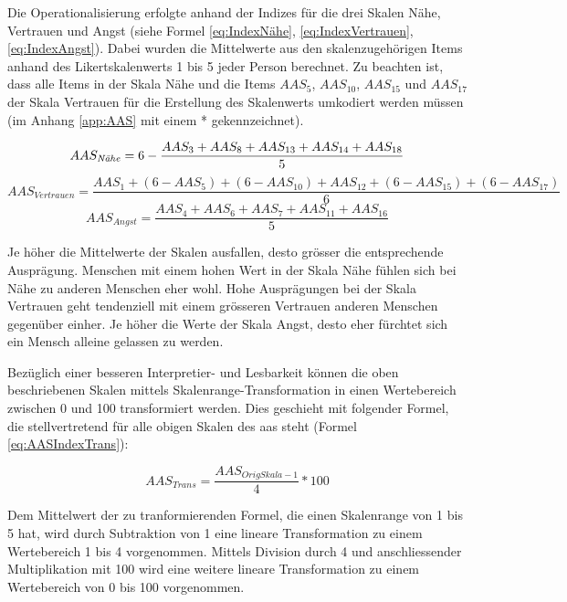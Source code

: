 Die Operationalisierung erfolgte anhand der Indizes für die drei Skalen Nähe, Vertrauen und Angst (siehe Formel \ref{eq:IndexNähe}, \ref{eq:IndexVertrauen}, \ref{eq:IndexAngst}). Dabei wurden die Mittelwerte aus den skalenzugehörigen Items anhand des Likertskalenwerts 1 bis 5 jeder Person berechnet. Zu beachten ist, dass alle Items in der Skala Nähe und die Items $AAS_{5}$, $AAS_{10}$, $AAS_{15}$ und $AAS_{17}$ der Skala Vertrauen für die Erstellung des Skalenwerts umkodiert werden müssen (im Anhang \ref{app:AAS} mit einem * gekennzeichnet). 

\begin{equation}\label{eq:IndexNähe}
    AAS_{\text{\textit{N{\"a}he}}}=6-\frac{AAS_{3}+AAS_{8}+AAS_{13}+AAS_{14}+AAS_{18}}{5}
\end{equation}
\begin{equation}\label{eq:IndexVertrauen}
    AAS_{Vertrauen}=\frac{AAS_{1}+(6-AAS_{5})+(6-AAS_{10})+AAS_{12}+(6-AAS_{15})+(6-AAS_{17})}{6}
\end{equation}
\begin{equation}\label{eq:IndexAngst}
    AAS_{Angst}=\frac{AAS_{4}+AAS_{6}+AAS_{7}+AAS_{11}+AAS_{16}}{5}
\end{equation}

Je höher die Mittelwerte der Skalen ausfallen, desto grösser die entsprechende Ausprägung. Menschen mit einem hohen Wert in der Skala Nähe fühlen sich bei Nähe zu anderen Menschen eher wohl. Hohe Ausprägungen bei der Skala Vertrauen geht tendenziell mit einem grösseren Vertrauen anderen Menschen gegenüber einher. Je höher die Werte der Skala Angst, desto eher fürchtet sich ein Mensch alleine gelassen zu werden.

Bezüglich einer besseren Interpretier- und Lesbarkeit können die oben beschriebenen Skalen mittels Skalenrange-Transformation in einen Wertebereich zwischen 0 und 100 transformiert werden. Dies geschieht mit folgender Formel, die stellvertretend für alle obigen Skalen des \acrshort{aas} steht (Formel \ref{eq:AASIndexTrans}):

\begin{equation}\label{eq:AASIndexTrans}
    AAS_{Trans}=\frac{AAS_{OrigSkala - 1}}{4}*100
\end{equation}

Dem Mittelwert der zu tranformierenden Formel, die einen Skalenrange von 1 bis 5 hat, wird durch Subtraktion von 1 eine lineare Transformation zu einem Wertebereich 1 bis 4 vorgenommen. Mittels Division durch 4 und anschliessender Multiplikation mit 100 wird eine weitere lineare Transformation zu einem Wertebereich von 0 bis 100 vorgenommen.

